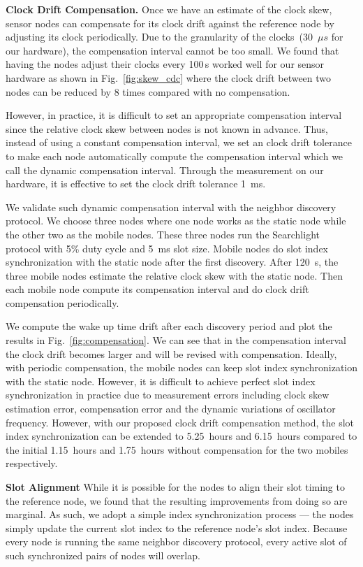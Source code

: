 \documentclass[twoside,twocolumn]{article}
\begin{document}
{\bf Clock Drift Compensation.} Once we have an estimate of the clock
skew, sensor nodes can compensate for its clock drift against the
reference node by adjusting its clock periodically. Due to the
granularity of the clocks~(30~$\mu s$ for our hardware), the compensation
interval cannot be too small. We found that having the nodes adjust 
their clocks every 100\,s worked well for our sensor hardware as shown 
in Fig.~\ref{fig:skew_cdc} where the clock drift between two nodes can
be reduced by 8 times compared with no compensation.

However, in practice, it is difficult to set an appropriate compensation
interval since the relative clock skew between nodes is not known in advance.
Thus, instead of using a constant compensation interval, we set an clock
drift tolerance to make each node automatically compute the compensation
interval which we call the dynamic compensation interval. Through the 
measurement on our hardware, it is effective to set the clock drift tolerance 
1~ms.

We validate such dynamic compensation interval with the neighbor discovery
protocol. We choose three nodes where one node works as the static node while 
the other two as the mobile nodes. These three nodes run the Searchlight 
protocol with 5\% duty cycle and 5~ms slot size. Mobile nodes do slot index 
synchronization with the static node after the first discovery. After 120~s, 
the three mobile nodes estimate the relative clock skew with the static node. 
Then each mobile node compute its compensation interval and do clock drift
compensation periodically.

We compute the wake up time drift after each discovery period and plot the
results in Fig.~\ref{fig:compensation}. We can see that in the compensation 
interval the clock drift becomes larger and will be revised with compensation. 
Ideally, with periodic compensation, the mobile nodes can keep slot index 
synchronization with the static node. However, it is difficult to achieve 
perfect slot index synchronization in practice due to measurement errors 
including clock skew estimation error, compensation error and the dynamic 
variations of oscillator frequency. However, with our proposed clock drift 
compensation method, the slot index synchronization can be extended to 
5.25~hours and 6.15~hours compared to the initial 1.15~hours and 1.75~hours 
without compensation for the two mobiles respectively.

{\bf Slot Alignment} While it is possible for the nodes to align their
slot timing to the reference node, we found that the resulting
improvements from doing so are marginal. As such, we adopt a simple
index synchronization process --- the nodes simply update the current
slot index to the reference node's slot index. Because every node is
running the same neighbor discovery protocol, every active slot of
such synchronized pairs of nodes will overlap.
\end{document}
